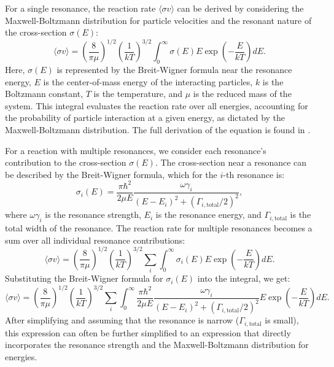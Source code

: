 \documentclass[a4paper,12pt]{article}
\begin{document}
For a single resonance, the reaction rate \(\langle \sigma v \rangle\) can be derived by considering the Maxwell-Boltzmann distribution for particle velocities and the resonant nature of the cross-section \(\sigma(E)\):
\begin{equation}
\langle \sigma v \rangle = \left( \frac{8}{\pi \mu} \right)^{1/2} \left( \frac{1}{kT} \right)^{3/2} \int_0^\infty \sigma(E) E \exp \left( -\frac{E}{kT} \right) dE.
\end{equation}
Here, \(\sigma(E)\) is represented by the Breit-Wigner formula near the resonance energy, \(E\) is the center-of-mass energy of the interacting particles, \(k\) is the Boltzmann constant, \(T\) is the temperature, and \(\mu\) is the reduced mass of the system. This integral evaluates the reaction rate over all energies, accounting for the probability of particle interaction at a given energy, as dictated by the Maxwell-Boltzmann distribution.  The full derivation of the equation is found in \citealp{RolfsRodney1988}.

For a reaction with multiple resonances, we consider each resonance's contribution to the cross-section \(\sigma(E)\). The cross-section near a resonance can be described by the Breit-Wigner formula, which for the \(i\)-th resonance is:
\begin{equation}
\sigma_i(E) = \frac{\pi \hbar^2}{2 \mu E} \frac{\omega \gamma_i}{(E - E_i)^2 + (\Gamma_{i,\text{total}}/2)^2},
\end{equation}
where \(\omega \gamma_i\) is the resonance strength, \(E_i\) is the resonance energy, and \(\Gamma_{i,\text{total}}\) is the total width of the resonance. The reaction rate for multiple resonances becomes a sum over all individual resonance contributions:
\begin{equation}
\langle \sigma v \rangle = \left( \frac{8}{\pi \mu} \right)^{1/2} \left( \frac{1}{kT} \right)^{3/2} \sum_i \int_0^\infty \sigma_i(E) E \exp \left( -\frac{E}{kT} \right) dE.
\end{equation}
Substituting the Breit-Wigner formula for \(\sigma_i(E)\) into the integral, we get:
\begin{equation}
\langle \sigma v \rangle = \left( \frac{8}{\pi \mu} \right)^{1/2} \left( \frac{1}{kT} \right)^{3/2} \sum_i \int_0^\infty \frac{\pi \hbar^2}{2 \mu E} \frac{\omega \gamma_i}{(E - E_i)^2 + (\Gamma_{i,\text{total}}/2)^2} E \exp \left( -\frac{E}{kT} \right) dE.
\end{equation}
After simplifying and assuming that the resonance is narrow (\(\Gamma_{i,\text{total}}\) is small), this expression can often be further simplified to an expression that directly incorporates the resonance strength and the Maxwell-Boltzmann distribution for energies.
\end{document}
